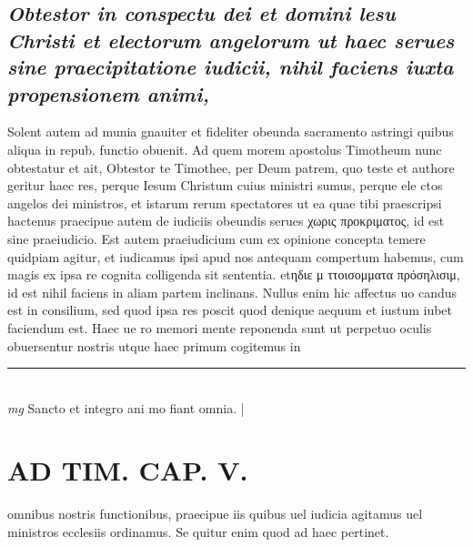 \documentclass{article}
\begin{document}
\begin{pages}
\subsection*{\textit{Obtestor in conspectu dei et domini lesu Christi et electorum angelorum ut haec serues sine praecipitatione iudicii, nihil faciens iuxta propensionem animi, }}\pstart Solent autem ad munia gnauiter et fideliter obeunda sacramento astringi quibus aliqua in repub. functio obuenit. Ad quem morem apostolus Timotheum nunc obtestatur et ait, Obtestor te Timothee, per Deum patrem, quo teste et authore geritur haec res, perque Iesum Christum cuius ministri sumus, perque ele ctos angelos dei ministros, et istarum rerum spectatores ut ea quae tibi praescripsi hactenus praecipue autem de iudiciis obeundis serues χωρις προκριματος, id est sine praeiudicio. Est autem praeiudicium cum ex opinione concepta temere quidpiam agitur, et iudicamus ipsi apud nos antequam compertum habemus, cum magis ex ipsa re cognita colligenda sit sententia. etηδιε μ ττοισομματα πρόσηλισιμ, id est nihil faciens in aliam partem inclinans. Nullus enim hic affectus uo candus est in consilium, sed quod ipsa res poscit quod denique aequum et iustum iubet faciendum est. Haec ue ro memori mente reponenda sunt ut perpetuo oculis obuersentur nostris utque haec primum cogitemus in  \pend
\vspace{0.5cm}\noindent
\vspace{0.2cm}\rule{1cm}{0.2pt}\\ 
\hspace{0.2cm}\textit{mg}
\footnotesize Sancto et integro ani mo fiant omnia. 
\normalsize| 
\section*{AD TIM. CAP. V. }
\marginpar{[ p.160 ]}\pstart omnibus nostris functionibus, praecipue iis quibus uel iudicia agitamus uel ministros ecclesiis ordinamus. Se quitur enim quod ad haec pertinet.  \pend
{}
{}

\end{pages}
\end{document}
